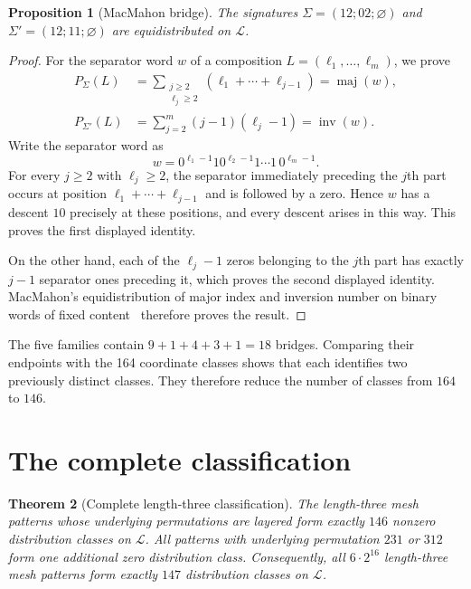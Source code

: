 \documentclass[12pt]{article}
\newtheorem{thm}{Theorem}[section]
\newtheorem{prop}[thm]{Proposition}
\newcommand{\cL}{\mathcal L}
\begin{document}
\begin{prop}[MacMahon bridge]\label{prop:macmahon}
The signatures $\Sigma=(12;02;\varnothing)$ and
$\Sigma'=(12;11;\varnothing)$ are equidistributed on $\cL$.
\end{prop}

\begin{proof}
For the separator word $w$ of a composition
$L=(\ell_1,\ldots,\ell_m)$, we prove
\[
\begin{aligned}
P_\Sigma(L)
&=\sum_{\substack{j\ge2\\ \ell_j\ge2}}
  (\ell_1+\cdots+\ell_{j-1})
 =\operatorname{maj}(w),\\
P_{\Sigma'}(L)
&=\sum_{j=2}^m(j-1)(\ell_j-1)
 =\operatorname{inv}(w).
\end{aligned}
\]
Write the separator word as
\[
w=
0^{\ell_1-1}1
0^{\ell_2-1}1
\cdots
1\,0^{\ell_m-1}.
\]
For every $j\ge2$ with $\ell_j\ge2$, the separator immediately preceding the
$j$th part occurs at position $\ell_1+\cdots+\ell_{j-1}$ and is followed by a
zero.  Hence $w$ has a descent $10$ precisely at these positions, and every
descent arises in this way.  This proves the first displayed identity.

On the other hand, each of the $\ell_j-1$ zeros belonging to the $j$th part
has exactly $j-1$ separator ones preceding it, which proves the second
displayed identity.  MacMahon's equidistribution of major index and inversion
number on binary words of fixed content~\cite{MacMahon} therefore proves the
result.
\end{proof}

The five families contain $9+1+4+3+1=18$ bridges.  Comparing their endpoints
with the 164 coordinate classes shows that each identifies two previously
distinct classes.  They therefore reduce the number of classes from $164$ to
$146$.

\section{The complete classification}\label{sec:classification}

\begin{thm}[Complete length-three classification]\label{thm:146}
The length-three mesh patterns whose underlying permutations are layered form
exactly $146$ nonzero distribution classes on $\cL$.  All patterns with
underlying permutation $231$ or $312$ form one additional zero distribution
class.  Consequently, all $6\cdot2^{16}$ length-three mesh patterns form
exactly $147$ distribution classes on $\cL$.
\end{thm}
\end{document}

